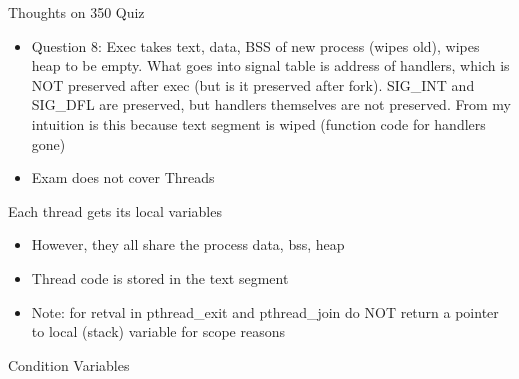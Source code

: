 Thoughts on 350 Quiz
\begin{itemize}
    \item Question 8: Exec takes text, data, BSS of new process (wipes old), wipes heap to be empty. What goes into signal table is address of handlers, which is NOT preserved after exec (but is it preserved after fork). SIG\_INT and SIG\_DFL are preserved, but handlers themselves are not preserved. From my intuition is this because text segment is wiped (function code for handlers gone)
    \item Exam does not cover Threads
\end{itemize}
Each thread gets its local variables
\begin{itemize}
    \item However, they all share the process data, bss, heap
    \item Thread code is stored in the text segment
    \item Note: for retval in pthread\_exit and pthread\_join do NOT return a pointer to local (stack) variable for scope reasons
\end{itemize}
Condition Variables
